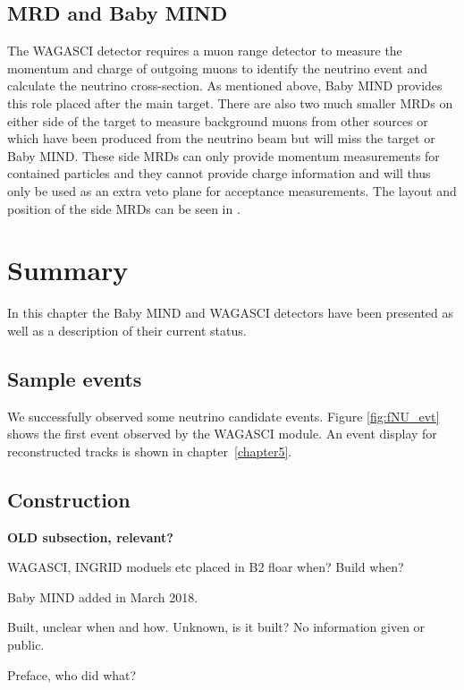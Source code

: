 \subsection{MRD and Baby MIND}
The WAGASCI detector requires a muon range detector to measure the momentum and charge of outgoing muons to identify the neutrino event and calculate the neutrino cross-section. As mentioned above, Baby MIND provides this role placed after the main target. There are also two much smaller MRDs on either side of the target to measure background muons from other sources or which have been produced from the neutrino beam but will miss the target or Baby MIND. These side MRDs can only provide momentum measurements for contained particles and they cannot provide charge information and will thus only be used as an extra veto plane for acceptance measurements. The layout and position of the side MRDs can be seen in . 

\section{Summary}
In this chapter the Baby MIND and WAGASCI detectors have been presented as well as a description of their current status.

\subsection{Sample events}

We successfully observed some neutrino candidate events. Figure \ref{fig:fNU_evt} shows the first event observed by the WAGASCI module. An event display for reconstructed tracks is shown in chapter~\ref{chapter5}.


\subsection{Construction}

\textbf{OLD subsection, relevant?}

WAGASCI, INGRID moduels etc placed in B2 floar when? Build when?

Baby MIND added in March 2018.

Built, unclear when and how.
Unknown, is it built? No information given or public.

Preface, who did what?

